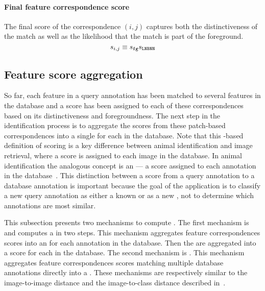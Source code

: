         \paragraph{Final feature correspondence score}
            The final score of the correspondence $(i, j)$ captures both the distinctiveness of the match as well
              as the likelihood that the match is part of the foreground.
              \begin{equation}\label{eqn:featscore}
                  s_{i,j} \equiv s_{{\tt fg}} s_{\tt{LNBNN}} 
              \end{equation}

    \subsection{Feature score aggregation}\label{subsec:namescore}

        So far, each feature in a query annotation has been matched to several features in the database and a
          score has been assigned to each of these correspondences based on its distinctiveness and foregroundness.
        The next step in the identification process is to aggregate the scores from these patch-based
          correspondences into a single \glossterm{\namescore} for each \name{} in the database.
        Note that this \name-based definition of scoring is a key difference between animal identification and
          image retrieval, where a score is assigned to each image in the database.
        In animal identification the analogous concept is an \glossterm{\annotscore} --- a score assigned to each
          annotation in the database~\cite{philbin_object_2007}.
        This distinction between a score from a query annotation to a database annotation is important because
          the goal of the application is to classify a new query annotation as either a known \name{} or as a new
          \name{}, not to determine which annotations are most similar.

        This subsection presents two mechanisms to compute \namescores{}.
        The first mechanism is \csumprefix{} and computes a \namescore{} in two steps.
        This mechanism aggregates feature correspondences scores into an \annotscore{} for each annotation in the
          database.
        Then the \annotscores{} are aggregated into a score for each \name{} in the database.
        The second mechanism is \nsumprefix{}.
        This mechanism aggregates feature correspondences scores matching multiple database annotations directly
          into a \namescore{}.
        These mechanisms are respectively similar to the image-to-image distance and the image-to-class distance
          described in~\cite{boiman_defense_2008}.

